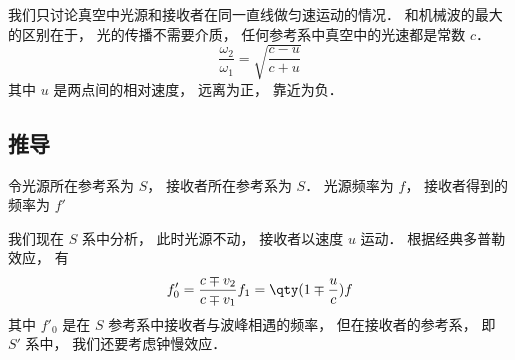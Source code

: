 

我们只讨论真空中光源和接收者在同一直线做匀速运动的情况． 和机械波的最大的区别在于， 光的传播不需要介质， 任何参考系中真空中的光速都是常数 $c$． %
\begin{equation}
\frac{\omega_2}{\omega_1} = \sqrt{\frac{c - u}{c + u}}
\end{equation}
其中 $u$ 是两点间的相对速度， 远离为正， 靠近为负．

\subsection{推导}
令光源所在参考系为 $S$， 接收者所在参考系为 $S$． 光源频率为 $f$， 接收者得到的频率为 $f'$

我们现在 $S$ 系中分析， 此时光源不动， 接收者以速度 $u$ 运动． 根据经典多普勒效应， 有
\begin{equation}
f'_0 = \frac{c \mp v_2}{c \mp v_1}f_1 = \qty(1 \mp \frac{u}{c})f
\end{equation}
其中 $f'_0$ 是在 $S$ 参考系中接收者与波峰相遇的频率， 但在接收者的参考系， 即 $S'$ 系中， 我们还要考虑钟慢效应．
